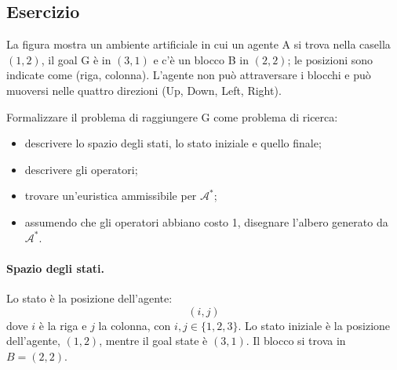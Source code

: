 \documentclass[a4paper, 11pt, oneside]{book}
\theoremstyle{definition}
\newcounter{escount}[section]
\newcommand{\esercizio}{
    \needspace{8\baselineskip}%
    \stepcounter{escount}%
    \subsection*{Esercizio \arabic{escount}}%
}
\begin{document}
    \esercizio
    \begin{enunciato}
        \begin{center}
        \end{center}

        La figura mostra un ambiente artificiale in cui un agente A si trova nella casella
        $(1, 2)$, il goal G \`e in $(3, 1)$ e c'\`e un blocco B in $(2, 2)$; le posizioni sono
        indicate come (riga, colonna). L'agente non pu\`o attraversare i blocchi e pu\`o
        muoversi nelle quattro direzioni (Up, Down, Left, Right).

        Formalizzare il problema di raggiungere G come problema di ricerca:
        \begin{itemize}
            \item descrivere lo spazio degli stati, lo stato iniziale e quello finale;
            \item descrivere gli operatori;
            \item trovare un'euristica ammissibile per $\mathcal{A}^*$;
            \item assumendo che gli operatori abbiano costo 1, disegnare l'albero generato
                da $\mathcal{A}^*$.
        \end{itemize}
    \end{enunciato}

    \paragraph{Spazio degli stati.} Lo stato \`e la posizione dell'agente:
    \[
        (i, j)
    \]
    dove $i$ \`e la riga e $j$ la colonna, con $i, j \in \{1, 2, 3\}$. Lo stato iniziale \`e
    la posizione dell'agente, $(1, 2)$, mentre il goal state \`e $(3, 1)$. Il blocco si trova
    in $B = (2, 2)$.
\end{document}
